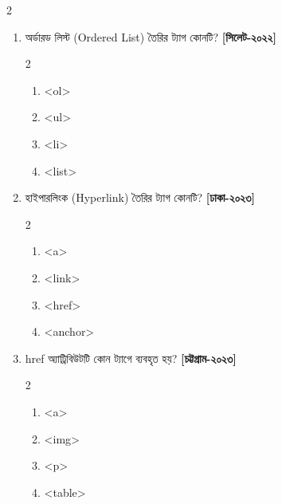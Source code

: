 \begin{multicols}{2}
\begin{enumerate}[resume=chFourFinalQuestions]
\begin{minipage}[t]{\linewidth}
\end{minipage}

\item \begin{minipage}[t]{\linewidth}
অর্ডারড লিস্ট (Ordered List) তৈরির ট্যাগ কোনটি? \textbf{[সিলেট-২০২২]}
\begin{multicols}{2}
\begin{enumerate}[label=\alph*)]
\item <ol> 
\item <ul>
\item <li>
\item <list>
\end{enumerate}
\end{multicols}
\par\addvspace{2pt}


\end{minipage}

\item \begin{minipage}[t]{\linewidth}
হাইপারলিংক (Hyperlink) তৈরির ট্যাগ কোনটি? \textbf{[ঢাকা-২০২৩]}
\begin{multicols}{2}
\begin{enumerate}[label=\alph*)]
\item <a> 
\item <link>
\item <href>
\item <anchor>
\end{enumerate}
\end{multicols}
\par\addvspace{2pt}


\end{minipage}

\item \begin{minipage}[t]{\linewidth}
href অ্যাট্রিবিউটটি কোন ট্যাগে ব্যবহৃত হয়? \textbf{[চট্টগ্রাম-২০২৩]}
\begin{multicols}{2}
\begin{enumerate}[label=\alph*)]
\item <a> 
\item <img>
\item <p>
\item <table>
\end{enumerate}
\end{multicols}
\par\addvspace{2pt}


\end{minipage}


\end{enumerate}
\end{multicols}

